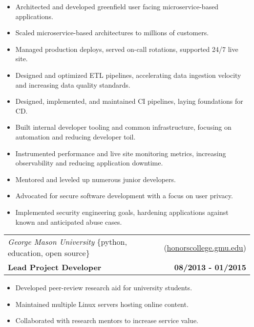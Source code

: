 \documentclass[10pt,letterpaper]{article}
\begin{document}
\begin{itemize}
\item Architected and developed greenfield user facing microservice-based applications.
\item Scaled microservice-based architectures to millions of customers.
\item Managed production deploys, served on-call rotations, supported 24/7 live site.
\item Designed and optimized ETL pipelines, accelerating data ingestion velocity and \linebreak increasing data quality standards.
\item Designed, implemented, and maintained CI pipelines, laying foundations for CD.
\item Built internal developer tooling and common infrastructure, focusing on automation \linebreak and reducing developer toil.
\item Instrumented performance and live site monitoring metrics, increasing observability \linebreak and reducing application downtime.
\item Mentored and leveled up numerous junior developers.
\item Advocated for secure software development with a focus on user privacy.
\item Implemented security engineering goals, hardening applications against known and \linebreak anticipated abuse cases.
\end{itemize}

\vspace{0.25cm}

\noindent\begin{tabularx}{\textwidth}{@{} Xr @{}}
  \textit{George Mason University} \{python, education, open source\} & (\href{https://honorscollege.gmu.edu}{honorscollege.gmu.edu}) \\
  \textbf{Lead Project Developer} & \textbf{08/2013 - 01/2015}
\end{tabularx}

\begin{itemize}
\item Developed peer-review research aid for university students.
\item Maintained multiple Linux servers hosting online content.
\item Collaborated with research mentors to increase service value.
\end{itemize}
\end{document}
